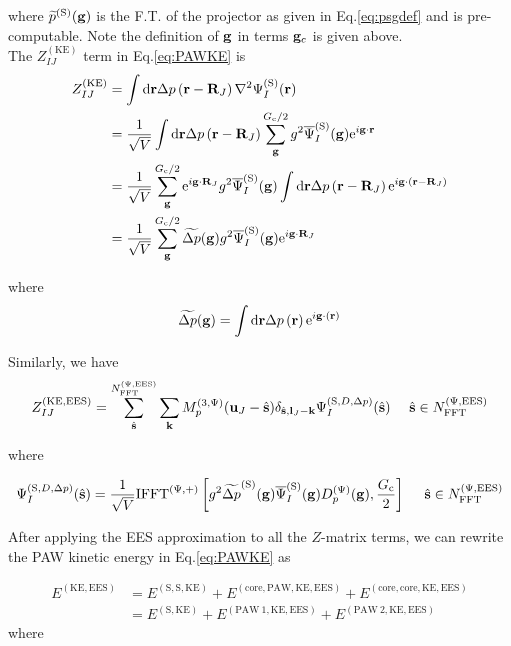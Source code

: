 \documentclass[paper=a4, fontsize=11pt]{article} %
\numberwithin{equation}{section} %
\numberwithin{figure}{section} %
\numberwithin{table}{section} %
\newcommand{\wt}{\widetilde}
\newcommand{\bu}{{\bf{u}}}
\newcommand{\bl}{{\bf{l}}}
\newcommand{\bk}{{\bf{k}}}
\newcommand{\bs}{{\bf{s}}}
\newcommand{\bg}{{\bf{g}}}
\newcommand{\br}{{\bf{r}}}
\newcommand{\bR}{{\bf{R}}}
\newcommand{\hs}{{\hat{\bf{s}}}}
\newcommand{\rS}{{\mathrm{S}}}
\newcommand{\rKE}{{\mathrm{KE}}}
\newcommand{\rEES}{{\mathrm{EES}}}
\newcommand{\rcore}{{\mathrm{core}}}
\newcommand{\re}{{\mathrm{e}}}
\newcommand{\rP}{{\mathrm{PAW}}}
\newcommand{\rd}{{\mathrm{d}}}
\newcommand{\ibgR}{i\bg\cdot\bR}
\newcommand{\ibgr}{i\bg\cdot\br}
\newcommand{\psigs}{{\overline \Psi_I^{(\rS)}(\bg)}}
\newcommand{\NFFTpEES}{{N^{\mathrm{(\Psi,\rEES})}_{\mathrm{FFT}}}}
\newcommand{\Gc}{{G_{\mathrm{c}}}}
\newcommand{\hGc}{{\frac{G_{\mathrm{c}}}{2}}}
\newcommand{\Dpg}{{D^{(\Psi)}_p(\bg)}}
\newcommand{\Mp}{{M_p^{(3,\Psi)}}}
\newcommand{\IFFTp}{{\mathrm{IFFT}^{(\Psi,+)}}}
\newcommand{\hsinpEES}{{\ \ \ \ \hs \in \NFFTpEES}}
\begin{document}
where $\wt {p}^{(\rS)} (\bg)$ is the F.T. of the projector as given in Eq.\eqref{eq:psgdef} and is pre-computable. Note the definition of $\bg$ in terms $\bg_c$ is given above.\\

The $Z_{IJ}^{(\rKE)}$ term in Eq.\eqref{eq:PAWKE} is
\begin{equation} \label{eq:ZKEpre}
\begin{split}
Z_{IJ}^{(\rKE)}
&=\int \rd\br\Delta p\left( \br-\bR_J \right)\nabla^2\Psi_I^{(\rS)}(\br)\\
 & = \frac{1}{\sqrt{V}}\int \rd\br\Delta p\left( \br-\bR_J \right)\sum_\bg^{\Gc/2} g^2 \psigs  \re^{\ibgr} \\
 & = \frac{1}{\sqrt{V}}\sum_\bg^{\Gc/2} \re^{\ibgR_J} g^2 \psigs  \int \rd\br\Delta p\left( \br-\bR_J \right) \re^{ i \bg\cdot(\br-\bR_J)} \\
 & = \frac{1}{\sqrt{V}}\sum_\bg^{\Gc/2} \wt{\Delta p} (\bg) g^2 \psigs  \re^{\ibgR_J} 
\end{split}
\end{equation}

where
\begin{equation}
\widetilde {\Delta p} (\bg) = \int \rd\br  \Delta p\left( \br\right)\re^{ i \bg\cdot(\br)}
\end{equation}


Similarly, we have
\begin{equation}
\begin{split}
Z_{IJ}^{(\rKE,\rEES)}
& = \sum_{\hat \bs}^{\NFFTpEES}  \sum_{\bk} \Mp(\bu_{J}-\hat \bs)\delta_{\hat \bs,\bl_J-\bk} \Psi_I^{(\rS,D,\Delta p)}(\hs) \hsinpEES\\
\end{split}
\end{equation}

where

\begin{equation}
\begin{split}
\Psi_I^{(\rS,D,\Delta p)}(\hs)
&= \frac{1}{\sqrt{V}}\IFFTp \left[ g^2  \wt {\Delta p}^{(\rS)}(\bg)\psigs \Dpg,\hGc\right]\hsinpEES \\
\end{split}
\end{equation}

After applying the EES approximation to all the $Z$-matrix terms, we can rewrite the PAW kinetic energy in Eq.\eqref{eq:PAWKE} as

\begin{equation} \label{eq:PAWKEEES}
\begin{split}
E^{(\rKE,\rEES)}
&=E^{(\rS,\rS,\rKE)}+ E^{(\rcore,\rP,\rKE,\rEES)} + E^{(\rcore,\rcore,\rKE,\rEES)}\\ 
&=E^{(\rS,\rKE)}+ E^{(\rP\ 1,\rKE,\rEES)} + E^{(\rP\ 2,\rKE,\rEES)}
\end{split}
\end{equation}
where
\end{document}

